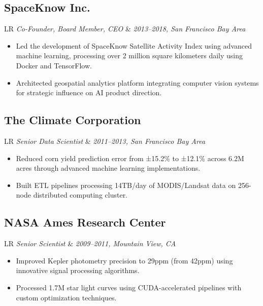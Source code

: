 \documentclass[11pt,a4paper]{moderncv}
\newcommand*{\experienceentry}[5][1mm]{
    \subsection{#2} \vspace{-1.5mm}
    \begin{tabularx}{\textwidth}{LR}
        {\itshape #3} & {\itshape #4, #5}
    \end{tabularx}
    \par\addvspace{#1}
}
\begin{document}
\begin{minipage}[t]{0.62\textwidth}
\experienceentry{SpaceKnow Inc.}{Co-Founder, Board Member, CEO }{2013--2018}{San Francisco Bay Area}
\begin{itemize}
    \item Led the development of SpaceKnow Satellite Activity Index using advanced machine learning, processing over 2 million square kilometers daily using Docker and TensorFlow.
    \item Architected geospatial analytics platform integrating computer vision systems for strategic influence on AI product direction.

\end{itemize}

\experienceentry{The Climate Corporation}{Senior Data Scientist}{2011--2013}{San Francisco Bay Area}
\begin{itemize}
    \item Reduced corn yield prediction error from ±15.2\% to ±12.1\% across 6.2M acres through advanced machine learning implementations.
    \item Built ETL pipelines processing 14TB/day of MODIS/Landsat data on 256-node distributed computing cluster.
\end{itemize}

\experienceentry{NASA Ames Research Center}{Senior Scientist}{2009--2011}{Mountain View, CA}
\begin{itemize}
    \item Improved Kepler photometry precision to 29ppm (from 42ppm) using innovative signal processing algorithms.
    \item Processed 1.7M star light curves using CUDA-accelerated pipelines with custom optimization techniques.
\end{itemize}

\end{minipage}
\hfill
\end{document}
